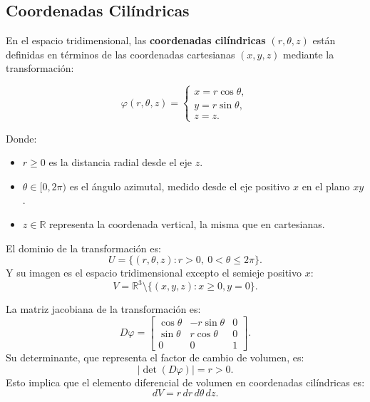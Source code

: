 \subsection{Coordenadas Cilíndricas}

\begin{definición}
En el espacio tridimensional, las \textbf{coordenadas cilíndricas} $(r, \theta, z)$ están definidas en términos de las coordenadas cartesianas $(x, y, z)$ mediante la transformación:\\

\begin{minipage}{0.5\textwidth}
    \[
        \varphi(r, \theta, z) =
        \begin{cases}
            x = r\cos\theta, \\
            y = r\sin\theta, \\
            z = z.
        \end{cases}
    \]
\end{minipage}
\begin{minipage}{0.5\textwidth}
    \centering
    
\end{minipage}

Donde:
\begin{itemize}
    \item $r \geq 0$ es la distancia radial desde el eje $z$.
    \item $\theta \in [0, 2\pi)$ es el ángulo azimutal, medido desde el eje positivo $x$ en el plano $xy$.
    \item $z \in \mathbb{R}$ representa la coordenada vertical, la misma que en cartesianas.
\end{itemize}

El dominio de la transformación es: $$ U = \{(r, \theta, z) : r > 0, \ 0 <
    \theta \leq 2\pi\}. $$ Y su imagen es el espacio tridimensional excepto el
semieje positivo $x$: $$ V = \mathbb{R}^3 \setminus \{ (x,y,z) : x \geq 0, y =
    0\}. $$

La matriz jacobiana de la transformación es: $$ D\varphi =
    \begin{bmatrix}
        \cos\theta & -r\sin\theta & 0 \\
        \sin\theta & r\cos\theta  & 0 \\
        0          & 0            & 1
    \end{bmatrix}.
$$
Su determinante, que representa el factor de cambio de volumen, es:
$$
    \left| \det(D\varphi) \right| = r > 0.
$$
Esto implica que el elemento diferencial de volumen en coordenadas cilíndricas es:
$$
    dV = r \, dr \, d\theta \, dz.
$$
\end{definición}

